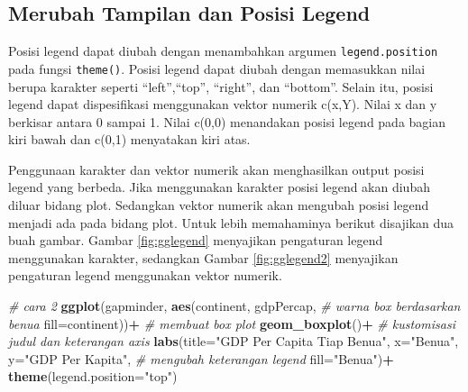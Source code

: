 \documentclass[]{book}
\newenvironment{Shaded}{\begin{snugshade}}{\end{snugshade}}
\newcommand{\KeywordTok}[1]{\textcolor[rgb]{0.13,0.29,0.53}{\textbf{#1}}}
\newcommand{\DataTypeTok}[1]{\textcolor[rgb]{0.13,0.29,0.53}{#1}}
\newcommand{\StringTok}[1]{\textcolor[rgb]{0.31,0.60,0.02}{#1}}
\newcommand{\CommentTok}[1]{\textcolor[rgb]{0.56,0.35,0.01}{\textit{#1}}}
\newcommand{\OperatorTok}[1]{\textcolor[rgb]{0.81,0.36,0.00}{\textbf{#1}}}
\newcommand{\NormalTok}[1]{#1}
\begin{document}
\subsection{Merubah Tampilan dan Posisi
Legend}\label{merubah-tampilan-dan-posisi-legend}

Posisi legend dapat diubah dengan menambahkan argumen
\texttt{legend.position} pada fungsi \texttt{theme()}. Posisi legend
dapat diubah dengan memasukkan nilai berupa karakter seperti
``left'',``top'', ``right'', dan ``bottom''. Selain itu, posisi legend
dapat dispesifikasi menggunakan vektor numerik c(x,Y). Nilai x dan y
berkisar antara 0 sampai 1. Nilai c(0,0) menandakan posisi legend pada
bagian kiri bawah dan c(0,1) menyatakan kiri atas.

Penggunaan karakter dan vektor numerik akan menghasilkan output posisi
legend yang berbeda. Jika menggunakan karakter posisi legend akan diubah
diluar bidang plot. Sedangkan vektor numerik akan mengubah posisi legend
menjadi ada pada bidang plot. Untuk lebih memahaminya berikut disajikan
dua buah gambar. Gambar \ref{fig:gglegend} menyajikan pengaturan legend
menggunakan karakter, sedangkan Gambar \ref{fig:gglegend2} menyajikan
pengaturan legend menggunakan vektor numerik.

\begin{Shaded}
\begin{Highlighting}[]
\CommentTok{# cara 2}
\KeywordTok{ggplot}\NormalTok{(gapminder, }\KeywordTok{aes}\NormalTok{(continent, gdpPercap, }
                      \CommentTok{# warna box berdasarkan benua}
                      \DataTypeTok{fill=}\NormalTok{continent))}\OperatorTok{+}
\StringTok{  }\CommentTok{# membuat box plot}
\StringTok{  }\KeywordTok{geom_boxplot}\NormalTok{()}\OperatorTok{+}
\StringTok{  }\CommentTok{# kustomisasi judul dan keterangan axis}
\StringTok{  }\KeywordTok{labs}\NormalTok{(}\DataTypeTok{title=}\StringTok{"GDP Per Capita Tiap Benua"}\NormalTok{,}
       \DataTypeTok{x=}\StringTok{"Benua"}\NormalTok{, }\DataTypeTok{y=}\StringTok{"GDP Per Kapita"}\NormalTok{,}
       \CommentTok{# mengubah keterangan legend}
       \DataTypeTok{fill=}\StringTok{"Benua"}\NormalTok{)}\OperatorTok{+}
\StringTok{  }\KeywordTok{theme}\NormalTok{(}\DataTypeTok{legend.position=}\StringTok{"top"}\NormalTok{)}
\end{Highlighting}
\end{Shaded}
\end{document}
